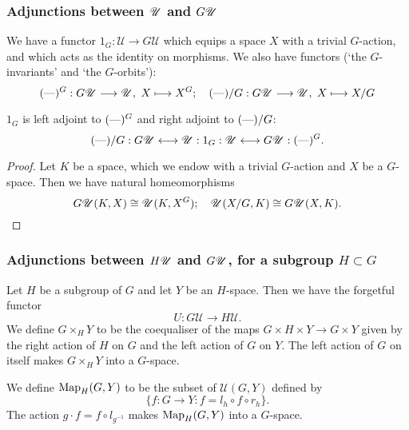 \documentclass[11pt]{article}
\begin{document}
\begin{FirstNineLectures}
\subsubsection*{Adjunctions between $\mathscr{U}$ and $G\mathscr{U}$}
We have a functor $1_G:\mathscr{U}\to G\mathscr{U}$ which equips a space $X$ with a trivial $G$-action, and which acts as the identity on morphisms.
We also have functors (`the $G$-invariants' and `the $G$-orbits'):
\[(\textup{---})^G:G\mathscr{U}\longrightarrow\mathscr{U}, \hspace{3pt} X\longmapsto X^G; \hspace{10pt}
(\textup{---})/G:G\mathscr{U}\longrightarrow\mathscr{U}, \hspace{3pt} X\longmapsto X/G\]
\begin{thm*} $1_G$ is left adjoint to $(\textup{---})^G$ and right adjoint to $(\textup{---})/G$:
\[(\textup{---})/G:G\mathscr{U}\longleftrightarrow\mathscr{U}: 1_G:\mathscr{U}\longleftrightarrow G\mathscr{U}: (\textup{---})^G.\]
\end{thm*}
\begin{proof}  Let $K$ be a space, which we endow with a trivial $G$-action and $X$ be a $G$-space. Then we have natural homeomorphisms
\[G\mathscr{U}(K,X)\cong\mathscr{U}(K,X^G);\hspace{10pt}
\mathscr{U}(X/G,K)\cong G\mathscr{U}(X,K).\qedhere\]
\end{proof}
\subsubsection*{Adjunctions between $H\mathscr{U}$ and $G\mathscr{U}$, for a subgroup $H\subset G$}
Let $H$ be a subgroup of $G$ and let $Y$ be an $H$-space. Then we have the forgetful functor
\[U:G\mathscr{U}\to H\mathscr{U}.\]
We define $G\times_H Y$ to be the coequaliser of the maps $G\times H\times Y\to G\times Y$ given by the right action of $H$ on $G$ and the left action of $G$ on $Y$. The left action of $G$ on itself makes $G\times_H Y$ into a $G$-space.

We define $\textup{Map}_H(G,Y)$ to be the subset of $\mathscr{U}(G,Y)$ defined by
\[\{f:G\to Y: f=l_h\circ f\circ r_h\}.\]
The action $g\cdot f=f\circ l_{g^{-1}}$ makes $\textup{Map}_H(G,Y)$ into a $G$-space.


\end{FirstNineLectures}
\end{document}
